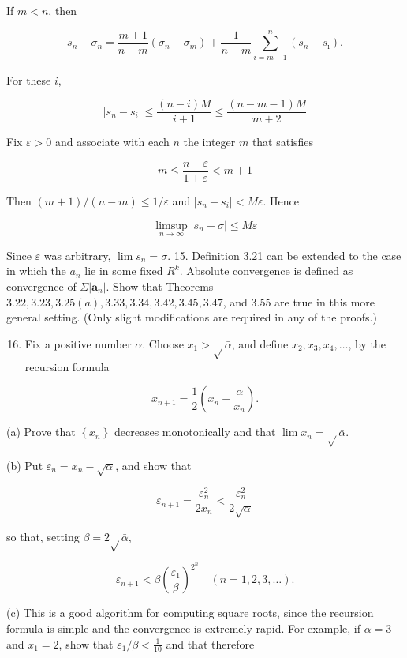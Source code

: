 \documentclass[10pt]{article}
\begin{document}
If $m<n$, then

$$
s_{n}-\sigma_{n}=\frac{m+1}{n-m}\left(\sigma_{n}-\sigma_{m}\right)+\frac{1}{n-m} \sum_{i=m+1}^{n}\left(s_{n}-s_{\imath}\right) .
$$

For these $i$,

$$
\left|s_{n}-s_{i}\right| \leq \frac{(n-i) M}{i+1} \leq \frac{(n-m-1) M}{m+2}
$$

Fix $\varepsilon>0$ and associate with each $n$ the integer $m$ that satisfies

$$
m \leq \frac{n-\varepsilon}{1+\varepsilon}<m+1
$$

Then $(m+1) /(n-m) \leq 1 / \varepsilon$ and $\left|s_{n}-s_{i}\right|<M \varepsilon$. Hence

$$
\limsup _{n \rightarrow \infty}\left|s_{n}-\sigma\right| \leq M \varepsilon
$$

Since $\varepsilon$ was arbitrary, $\lim s_{n}=\sigma$. 15. Definition 3.21 can be extended to the case in which the $a_{n}$ lie in some fixed $R^{k}$. Absolute convergence is defined as convergence of $\Sigma\left|\mathbf{a}_{n}\right|$. Show that Theorems $3.22,3.23,3.25(a), 3.33,3.34,3.42,3.45,3.47$, and 3.55 are true in this more general setting. (Only slight modifications are required in any of the proofs.)

\begin{enumerate}
  \setcounter{enumi}{15}
  \item Fix a positive number $\alpha$. Choose $x_{1}>\sqrt{ } \bar{\alpha}$, and define $x_{2}, x_{3}, x_{4}, \ldots$, by the recursion formula
\end{enumerate}

$$
x_{n+1}=\frac{1}{2}\left(x_{n}+\frac{\alpha}{x_{n}}\right) .
$$

(a) Prove that $\left\{x_{n}\right\}$ decreases monotonically and that $\lim x_{n}=\sqrt{ } \bar{\alpha}$.

(b) Put $\varepsilon_{n}=x_{n}-\sqrt{\alpha}$, and show that

$$
\varepsilon_{n+1}=\frac{\varepsilon_{n}^{2}}{2 x_{n}}<\frac{\varepsilon_{n}^{2}}{2 \sqrt{\alpha}}
$$

so that, setting $\beta=2 \sqrt{ } \bar{\alpha}$,

$$
\varepsilon_{n+1}<\beta\left(\frac{\varepsilon_{1}}{\beta}\right)^{2^{n}} \quad(n=1,2,3, \ldots) .
$$

(c) This is a good algorithm for computing square roots, since the recursion formula is simple and the convergence is extremely rapid. For example, if $\alpha=3$ and $x_{1}=2$, show that $\varepsilon_{1} / \beta<\frac{1}{10}$ and that therefore
\end{document}
